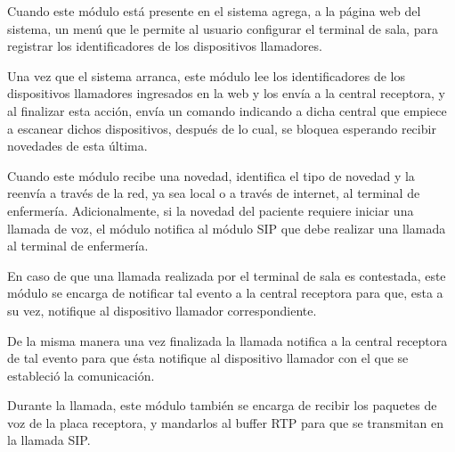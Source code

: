 Cuando este módulo está presente en el sistema agrega, a la página web del sistema, un menú que le permite al usuario configurar el terminal de sala, para registrar los identificadores de los dispositivos llamadores.

Una vez que el sistema arranca, este módulo lee los identificadores de los dispositivos llamadores ingresados en la web y los envía a la central receptora, y al finalizar esta acción, envía un comando indicando a dicha central que empiece a escanear dichos dispositivos, después de lo cual, se bloquea esperando recibir novedades de esta última.

Cuando este módulo recibe una novedad, identifica el tipo de novedad y la reenvía a través de la red, ya sea local o a través de internet, al terminal de enfermería. Adicionalmente, si la novedad del paciente requiere iniciar una llamada de voz, el módulo notifica al módulo SIP que debe realizar una llamada al terminal de enfermería.

En caso de que una llamada realizada por el terminal de sala es contestada, este módulo se encarga de notificar tal evento a la central receptora para que, esta a su vez, notifique al dispositivo llamador correspondiente.

De la misma manera una vez finalizada la llamada notifica a la central receptora de tal evento para que ésta notifique al dispositivo llamador con el que se estableció la comunicación.

Durante la llamada, este módulo también se encarga de recibir los paquetes de voz de la placa receptora, y mandarlos al buffer RTP para que se transmitan en la llamada SIP.
